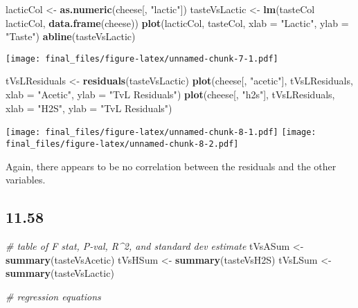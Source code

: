 \documentclass[]{article}
\newenvironment{Shaded}{\begin{snugshade}}{\end{snugshade}}
\newcommand{\CommentTok}[1]{\textcolor[rgb]{0.56,0.35,0.01}{\textit{#1}}}
\newcommand{\DataTypeTok}[1]{\textcolor[rgb]{0.13,0.29,0.53}{#1}}
\newcommand{\KeywordTok}[1]{\textcolor[rgb]{0.13,0.29,0.53}{\textbf{#1}}}
\newcommand{\NormalTok}[1]{#1}
\newcommand{\OperatorTok}[1]{\textcolor[rgb]{0.81,0.36,0.00}{\textbf{#1}}}
\newcommand{\StringTok}[1]{\textcolor[rgb]{0.31,0.60,0.02}{#1}}
\begin{document}
\begin{Shaded}
\begin{Highlighting}[]
\NormalTok{lacticCol <-}\StringTok{ }\KeywordTok{as.numeric}\NormalTok{(cheese[, }\StringTok{"lactic"}\NormalTok{])}
\NormalTok{tasteVsLactic <-}\StringTok{ }\KeywordTok{lm}\NormalTok{(tasteCol }\OperatorTok{~}\StringTok{ }\NormalTok{lacticCol, }\KeywordTok{data.frame}\NormalTok{(cheese))}
\KeywordTok{plot}\NormalTok{(lacticCol, tasteCol, }\DataTypeTok{xlab =} \StringTok{"Lactic"}\NormalTok{, }\DataTypeTok{ylab =} \StringTok{"Taste"}\NormalTok{)}
\KeywordTok{abline}\NormalTok{(tasteVsLactic)}
\end{Highlighting}
\end{Shaded}

\texttt{[image: final\_files/figure-latex/unnamed-chunk-7-1.pdf]}

\begin{Shaded}
\begin{Highlighting}[]
\NormalTok{tVsLResiduals <-}\StringTok{ }\KeywordTok{residuals}\NormalTok{(tasteVsLactic)}
\KeywordTok{plot}\NormalTok{(cheese[, }\StringTok{"acetic"}\NormalTok{], tVsLResiduals, }\DataTypeTok{xlab =} \StringTok{"Acetic"}\NormalTok{, }\DataTypeTok{ylab =} \StringTok{"TvL Residuals"}\NormalTok{)}
\KeywordTok{plot}\NormalTok{(cheese[, }\StringTok{"h2s"}\NormalTok{], tVsLResiduals, }\DataTypeTok{xlab =} \StringTok{"H2S"}\NormalTok{, }\DataTypeTok{ylab =} \StringTok{"TvL Residuals"}\NormalTok{)}
\end{Highlighting}
\end{Shaded}

\texttt{[image: final\_files/figure-latex/unnamed-chunk-8-1.pdf]}
\texttt{[image: final\_files/figure-latex/unnamed-chunk-8-2.pdf]}

Again, there appears to be no correlation between the residuals and the
other variables.

\hypertarget{section-5}{%
\subsection{11.58}\label{section-5}}

\begin{Shaded}
\begin{Highlighting}[]
\CommentTok{# table of F stat, P-val, R^2, and standard dev estimate}
\NormalTok{tVsASum <-}\StringTok{ }\KeywordTok{summary}\NormalTok{(tasteVsAcetic)}
\NormalTok{tVsHSum <-}\StringTok{ }\KeywordTok{summary}\NormalTok{(tasteVsH2S)}
\NormalTok{tVsLSum <-}\StringTok{ }\KeywordTok{summary}\NormalTok{(tasteVsLactic)}


\CommentTok{# regression equations}
\end{Highlighting}
\end{Shaded}
\end{document}
